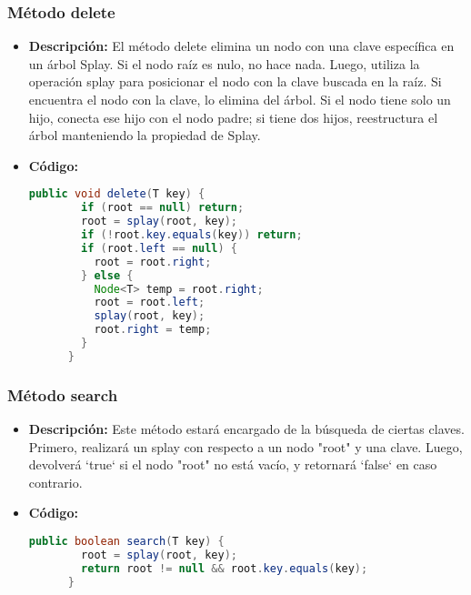 \documentclass{article}
\begin{document}
  \subsubsection{Método delete}
  \begin{itemize}
    \item \textbf{Descripción: }El método delete elimina un nodo con una clave específica en un árbol Splay. 
    Si el nodo raíz es nulo, no hace nada. Luego, utiliza la operación splay para posicionar el nodo con la clave 
    buscada en la raíz. Si encuentra el nodo con la clave, lo elimina del árbol. Si el nodo tiene solo un hijo, 
    conecta ese hijo con el nodo padre; si tiene dos hijos, reestructura el árbol manteniendo la propiedad de Splay.
    \item \textbf{Código: }
    \begin{lstlisting}[language=Java, caption={Método delete}]
      public void delete(T key) {
        if (root == null) return;
        root = splay(root, key);
        if (!root.key.equals(key)) return;
        if (root.left == null) {
          root = root.right;
        } else {
          Node<T> temp = root.right;
          root = root.left;
          splay(root, key);
          root.right = temp;
        }
      }
    \end{lstlisting}
  \end{itemize}
  

  \subsubsection{Método search}
  \begin{itemize}
    \item \textbf{Descripción: }Este método estará encargado de la búsqueda de ciertas claves. Primero, realizará un splay 
    con respecto a un nodo "root" y una clave. Luego, devolverá `true` si el nodo "root" no está vacío, y retornará `false` en caso contrario.
    \item \textbf{Código: }
    \begin{lstlisting}[language=Java, caption={Método search}]
      public boolean search(T key) {
        root = splay(root, key);
        return root != null && root.key.equals(key);
      }
    \end{lstlisting}
  \end{itemize}
  
\end{document}
